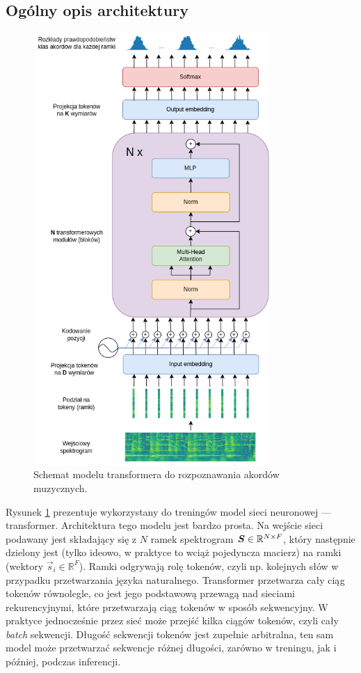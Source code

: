 \subsection{Ogólny opis architektury}

\begin{figure}
    \centering
    \includegraphics[width=0.8\textwidth]{./images/transformer.png}
    \caption{Schemat modelu transformera do rozpoznawania akordów muzycznych.}
    \label{fig:transformer}
\end{figure}

Rysunek \ref{fig:transformer} prezentuje wykorzystany do treningów model sieci neuronowej ---
transformer. Architektura tego modelu jest bardzo prosta. Na wejście sieci podawany jest składający
się z $N$ ramek spektrogram $\boldsymbol{S} \in \mathbb{R}^{N \times F}$, który następnie dzielony jest (tylko ideowo, w
praktyce to wciąż pojedyncza macierz) na ramki (wektory $\vec s_i \in \mathbb{R}^F$). Ramki odgrywają
rolę tokenów, czyli np. kolejnych słów w przypadku przetwarzania języka naturalnego. Transformer
przetwarza cały ciąg tokenów równolegle, co jest jego podstawową przewagą nad sieciami
rekurencyjnymi, które przetwarzają ciąg tokenów w sposób sekwencyjny. W praktyce jednocześnie przez
sieć może przejść kilka ciągów tokenów, czyli cały \emph{batch} sekwencji. Długość sekwencji tokenów
jest zupełnie arbitralna, ten sam model może przetwarzać sekwencje różnej długości, zarówno w
treningu, jak i później, podczas inferencji.

